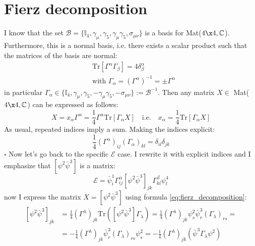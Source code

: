 \documentclass[english, LaM, oneside, noexaminfo]{sapthesis}
\begin{document}
\section{Fierz decomposition}
\noindent
I know that the set $\mathcal{B} = \{\mathbb{I}_4,\gamma_\mu, \gamma_5, \gamma_\mu\gamma_5, \sigma_{\mu\nu} \}$ is a basis for Mat($4 \x 4, \mathbb{C}$).
Furthermore, this is a normal basis, i.e. there exists a scalar product such that the matrices of the basis are normal:
\begin{equation*}
    \begin{aligned}
        &\text{Tr}\left[\Gamma^\alpha \Gamma_\beta\right] = 4 \delta^\alpha_\beta \\
        & \text{with } \Gamma_\alpha = (\Gamma^\alpha)^{-1} = \pm  \Gamma^\alpha
    \end{aligned}
\end{equation*}
in particular $\Gamma_\alpha \in \{\mathbb{I}_4,\gamma_\mu, \gamma_5, -\gamma_\mu\gamma_5, -\sigma_{\mu\nu} \} := \mathcal{B}^{-1}$.
Then any matrix $X \in$ Mat($4 \x 4, \mathbb{C}$) can be expressed as follows:
\begin{equation}\label{eq:fierz_decomposition}
    X = x_\alpha \Gamma^{\alpha} = \frac{1}{4} \Gamma^{\alpha} \text{Tr} \left[\Gamma_{\alpha} X\right] 
    \quad \text{i.e.} \quad x_\alpha = \frac{1}{4}\text{Tr} \left[\Gamma_{\alpha} X\right] 
\end{equation}
As usual, repeated indices imply a sum.
Making the indices explicit:
\begin{equation*}
    \frac{1}{4} \left(\Gamma^\alpha\right)_{ij} \left(\Gamma_\alpha\right)_{kl} = \delta_{il} \delta_{jk}
\end{equation*}
\hspace*{.97\textwidth} $\square$ \newline
Now let's go back to the specific $\mathcal{E}$ case.
I rewrite it with explicit indices and I emphasize that $\left[\psi^2 \bar\psi^3\right]$ is a matrix:
\begin{equation*}
    \mathcal{E} = \bar\psi^1_i \Gamma^\alpha_{ij} \left[\psi^2 \bar\psi^3\right]_{jk} \Gamma^\beta_{kl} \psi^4_l 
\end{equation*}
now I express the matrix $X = \left[\psi^2 \bar\psi^3\right]$ using formula \ref{eq:fierz_decomposition}:
\begin{equation*}
    \begin{aligned}
        \left[\psi^2 \bar\psi^3\right]_{jk}
        & = \frac{1}{4} \left(\Gamma^\lambda\right)_{jk} \text{Tr}\left( \left[\psi^2 \bar\psi^3\right] \Gamma_\lambda\right) = \frac{1}{4} \left(\Gamma^\lambda\right)_{jk}  \psi^2_s \bar\psi^3_r  \left(\Gamma_\lambda\right)_{rs} = \\
        & = - \frac{1}{4} \left(\Gamma^\lambda\right)_{jk} \bar\psi^3_r  \left(\Gamma_\lambda\right)_{rs}  \psi^2_s = - \frac{1}{4} \left(\Gamma^\lambda\right)_{jk}  \left( \bar\psi^3 \Gamma_\lambda \psi^2\right) \\
    \end{aligned}
\end{equation*}
\end{document}
